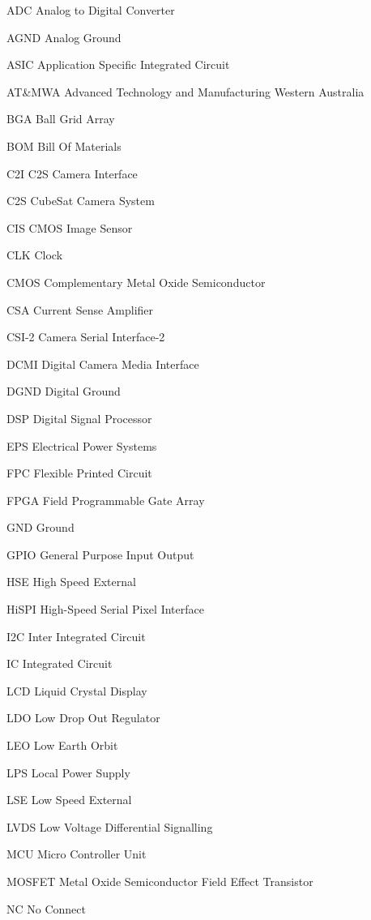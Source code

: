 \begin{abbreviations}
\item[ADC] Analog to Digital Converter 
\item[AGND] Analog Ground 
\item[ASIC] Application Specific Integrated Circuit
\item[AT\&MWA] Advanced Technology and Manufacturing Western Australia
\item[BGA] Ball Grid Array 
\item[BOM] Bill Of Materials 
\item[C2I] C2S Camera Interface
\item[C2S] CubeSat Camera System
\item[CIS] CMOS Image Sensor
\item[CLK] Clock
\item[CMOS] Complementary Metal Oxide Semiconductor
\item[CSA] Current Sense Amplifier
\item[CSI-2] Camera Serial Interface-2
\item[DCMI] Digital Camera Media Interface
\item[DGND] Digital Ground
\item[DSP] Digital Signal Processor
\item[EPS] Electrical Power Systems
\item[FPC] Flexible Printed Circuit
\item[FPGA] Field Programmable Gate Array
\item[GND] Ground
\item[GPIO] General Purpose Input Output
\item[HSE] High Speed External
\item[HiSPI] High-Speed Serial Pixel Interface
\item[I2C] Inter Integrated Circuit
\item[IC] Integrated Circuit 
\item[LCD] Liquid Crystal Display
\item[LDO] Low Drop Out Regulator
\item[LEO] Low Earth Orbit
\item[LPS] Local Power Supply
\item[LSE] Low Speed External
\item[LVDS] Low Voltage Differential Signalling
\item[MCU] Micro Controller Unit
\item[MOSFET] Metal Oxide Semiconductor Field Effect Transistor
\item[NC] No Connect

\end{abbreviations}
